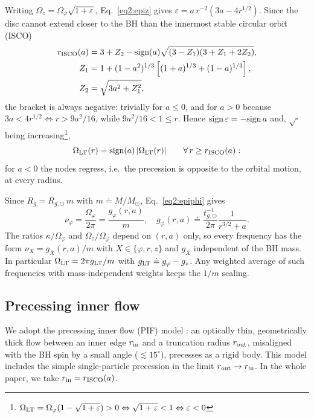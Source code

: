 Writing $\Omega_z=\Omega_\varphi\sqrt{1+\varepsilon}$, Eq.~\eqref{eq2:epiz} gives $\varepsilon=a\,r^{-2}\left(3a-4r^{1/2}\right)$.
Since the disc cannot extend closer to the BH than the innermost stable circular orbit (ISCO)
\begin{align}
    \label{eq2:isco}
    r_\textup{ISCO}(a) &= 3 + Z_2 - \text{sign}(a)\sqrt{(3-Z_1)(3+Z_1+2Z_2)}, \\
    Z_1 &= 1+(1-a^2)^{1/3}\left[(1+a)^{1/3}+(1-a)^{1/3}\right], \\
    Z_2 &=\sqrt{3a^2+Z_1^2},
\end{align}
the bracket is always negative: trivially for $a\leq0$, and for $a>0$ because $3a<4r^{1/2}\iff r>9a^2/16$, while $9a^2/16<1\leq r$.
Hence $\textup{sign}\,\varepsilon=-\textup{sign}\,a$ and, $\sqrt{\cdot}$ being increasing\footnote{$\Omega_\textup{LT}=\Omega_\varphi(1-\sqrt{1+\varepsilon})>0 \Leftrightarrow \sqrt{1+\varepsilon}<1 \Leftrightarrow \varepsilon <0 $},
\begin{equation}
    \label{eq2:signLT}
    \Omega_\textup{LT}(r)=\textup{sign}(a)\,|\Omega_\textup{LT}(r)| \qquad \forall\, r\geq r_\textup{ISCO}(a):
\end{equation}
for $a<0$ the nodes regress, i.e.\ the precession is opposite to the orbital motion, at every radius.

Since $R_g = R_{g,\odot}\,m$ with $m\doteq M/M_\odot$, Eq.~\eqref{eq2:epiphi} gives
\begin{equation}
    \label{eq2:scale_nu}
    \nu_\varphi=\frac{\Omega_\varphi}{2\pi}=\frac{g_\varphi(r,a)}{m},
    \quad
    g_\varphi(r,a)\doteq\frac{t_{g,\odot}^{-1}}{2\pi}\frac{1}{r^{3/2}+a}.
\end{equation}
The ratios $\kappa/\Omega_\varphi$ and $\Omega_z/\Omega_\varphi$ depend on $(r,a)$ only, so every frequency has the form $\nu_X=g_X(r,a)/m$ with $X\in\{\varphi,r,z\}$ and $g_X$ independent of the BH mass.
In particular $\Omega_\textup{LT}=2\pi g_\textup{LT}/m$ with $g_\textup{LT}\doteq g_\varphi-g_z$.
Any weighted average of such frequencies with mass-independent weights keeps the $1/m$ scaling.


\subsection{Precessing inner flow}
\label{sec2:pif}

We adopt the precessing inner flow (PIF) model \citep{PIF}: an optically thin, geometrically thick flow between an inner edge $r_\textup{in}$ and a truncation radius $r_\textup{out}$, misaligned with the BH spin by a small angle ($\lesssim15^\circ$), precesses as a rigid body.
This model includes the simple single-particle precession \citep{stella1,stella2} in the limit $r_\textup{out}\to r_\textup{in}$.
In the whole paper, we take $r_\textup{in}=r_\textup{ISCO}(a)$.

